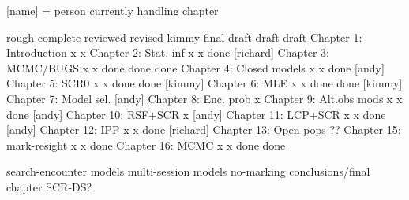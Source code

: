 [name] = person currently handling chapter


                          rough   complete reviewed  revised kimmy       final draft
                          draft    draft
Chapter 1: Introduction       x       x
Chapter 2: Stat. inf          x       x     done    [richard]
Chapter 3: MCMC/BUGS          x       x     done     done    done
Chapter 4: Closed models      x       x     done    [andy]
Chapter 5: SCR0               x       x     done     done   [kimmy]
Chapter 6: MLE                x       x     done     done   [kimmy]
Chapter 7: Model sel.       [andy]
Chapter 8: Enc. prob          x      
Chapter 9: Alt.obs mods       x       x     done    [andy] 
Chapter 10: RSF+SCR           x    [andy]
Chapter 11: LCP+SCR           x       x     done    [andy]
Chapter 12: IPP               x       x     done    [richard]
Chapter 13: Open pops       ??
Chapter 15: mark-resight      x       x     done
Chapter 16: MCMC              x       x     done     done


search-encounter models
multi-session models
no-marking 
conclusions/final chapter
SCR-DS?


